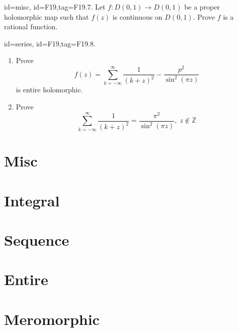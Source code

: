 \documentclass[12pt,letterpaper]{article}
\theoremstyle{plain}
\theoremstyle{definition}
\begin{document}
{\item[id=misc, id=F19,tag=F19.7.]
Let $f : D(0,1) \rightarrow D(0,1)$ be a proper holomorphic map such that $f(z)$ is continuous on $\overline{D(0,1)}$. Prove $f$ is a rational function.


\item[id=series, id=F19,tag=F19.8.]
\begin{enumerate}[label=(\alph*)]\onlyitems
\item Prove
\[
	f(z) = \sum_{k=-\infty}^{\infty} \frac{1}{(k+z)^2} - \frac{p^2}{\sin^2(\pi z)}
\]
is entire holomorphic.
\item Prove
\[
	\sum_{k=-\infty}^{\infty} \frac{1}{(k+z)^2} = \frac{\pi^2}{\sin^2(\pi z)}, \; z \notin \mathbb{Z}
\]
\end{enumerate}

}
\tableofcontents
\newpage
\section{Misc}
\begin{itemize}\setlength\itemsep{4em}\onlyitems[none, include=misc]
\mylist
\end{itemize}
\newpage

\section{Integral}
\begin{itemize}\setlength\itemsep{4em}\onlyitems[none, include=integral]
\mylist
\end{itemize}
\newpage

\section{Sequence}
\begin{itemize}\setlength\itemsep{4em}\onlyitems[none, include=sequence]
\mylist
\end{itemize}
\newpage

\section{Entire}
\begin{itemize}\setlength\itemsep{4em}\onlyitems[none, include=entire]
\mylist
\end{itemize}
\newpage

\section{Meromorphic}
\begin{itemize}\setlength\itemsep{4em}\onlyitems[none, include=meromorphic]
\mylist
\end{itemize}
\newpage
\end{document}
